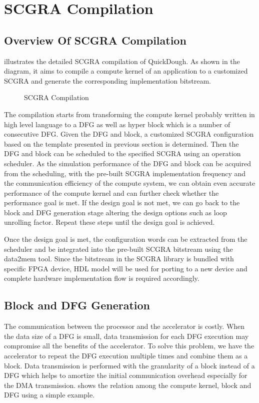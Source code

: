 \section{SCGRA Compilation} \label{sec:scgracompile}
\subsection{Overview Of SCGRA Compilation}
 illustrates the detailed SCGRA compilation of QuickDough. As shown in the diagram, it aims to compile a compute kernel of an application to a customized SCGRA and generate the corresponding implementation bitstream. 
 
\begin{figure}[htb]
\caption{SCGRA Compilation}
\label{fig:scgra-compile}
\end{figure}

The compilation starts from transforming the compute kernel probably written in high level language to a DFG as well as hyper block which is a number of consecutive DFG. Given the DFG and block, a customized SCGRA configuration based on the template presented in previous section is determined. Then the DFG and block can be scheduled to the specified SCGRA using an operation scheduler. As the simulation performance of the DFG and block can be acquired from the scheduling, with the pre-built SCGRA implementation frequency and the communication efficiency of the compute system, we can obtain even accurate performance of the compute kernel and can further check whether the performance goal is met. If the design goal is not met, we can go back to the block and DFG generation stage altering the design options such as loop unrolling factor. Repeat these steps until the design goal is achieved.

Once the design goal is met, the configuration words can be extracted from the scheduler and be integrated into the pre-built SCGRA bitstream using the data2mem tool. Since the bitstream in the SCGRA library is bundled with specific FPGA device, HDL model will be used for porting to a new device and complete hardware implementation flow is required accordingly.

\subsection{Block and DFG Generation}
The communication between the processor and the accelerator is costly. When the data size of a DFG is small, data transmission for each DFG execution may compromise all the benefits of the accelerator. To solve this problem, we have the accelerator to repeat the DFG execution multiple times and combine them as a block. Data transmission is performed with the granularity of a block instead of a DFG which helps to amortize the initial communication overhead especially for the DMA transmission.  shows the relation among the compute kernel, block and DFG using a simple example. 

